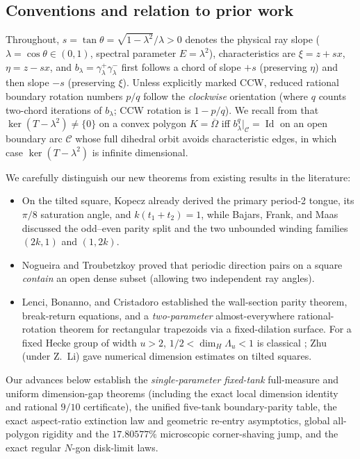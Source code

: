 \documentclass[11pt,reqno]{amsart}
\theoremstyle{definition}
\theoremstyle{remark}
\DeclareMathOperator{\Id}{Id}
\begin{document}
\subsection*{Conventions and relation to prior work}
Throughout, $s = \tan\theta = \sqrt{1-\lambda^2}/\lambda > 0$ denotes the physical ray slope ($\lambda = \cos\theta \in (0,1)$, spectral parameter $E = \lambda^2$), characteristics are $\xi = z + sx$, $\eta = z - sx$, and $b_\lambda = \gamma_\lambda^+\gamma_\lambda^-$ first follows a chord of slope $+s$ (preserving $\eta$) and then slope $-s$ (preserving $\xi$). Unless explicitly marked CCW, reduced rational boundary rotation numbers $p/q$ follow the \emph{clockwise} orientation (where $q$ counts two-chord iterations of $b_\lambda$; CCW rotation is $1 - p/q$). We recall from \cite[Thms.~2.1--2.2]{Paper1} that $\ker(T - \lambda^2) \ne \{0\}$ on a convex polygon $K = \overline{\Omega}$ iff $b_\lambda^q|_{\mathcal{C}} = \Id$ on an open boundary arc $\mathcal{C}$ whose full dihedral orbit avoids characteristic edges, in which case $\ker(T - \lambda^2)$ is infinite dimensional.

We carefully distinguish our new theorems from existing results in the literature:
\begin{itemize}
  \item On the tilted square, Kopecz \cite[Thms.~1--3 and p.~9]{Kopecz2006} already derived the primary period-2 tongue, its $\pi/8$ saturation angle, and $k(t_1+t_2) = 1$, while Bajars, Frank, and Maas \cite[\S 2.4]{BajarsFrankMaas2013} discussed the odd--even parity split and the two unbounded winding families $(2k,1)$ and $(1,2k)$.
  \item Nogueira and Troubetzkoy \cite[Thm.~13]{NogueiraTroubetzkoy2020} proved that periodic direction pairs on a square \emph{contain} an open dense subset (allowing two independent ray angles).
  \item Lenci, Bonanno, and Cristadoro \cite[Prop.~3.1, Thm.~3.2, Rem.~3.5, App.~A]{LBC2023} established the wall-section parity theorem, break-return equations, and a \emph{two-parameter} almost-everywhere rational-rotation theorem for rectangular trapezoids via a fixed-dilation surface. For a fixed Hecke group of width $u > 2$, $1/2 < \dim_H \Lambda_u < 1$ is classical \cite{Soares2021}; Zhu (under Z.~Li) \cite[\S 4.1]{ZhuLi2022} gave numerical dimension estimates on tilted squares.
\end{itemize}
Our advances below establish the \emph{single-parameter fixed-tank} full-measure and uniform dimension-gap theorems (including the exact local dimension identity and rational $9/10$ certificate), the unified five-tank boundary-parity table, the exact aspect-ratio extinction law and geometric re-entry asymptotics, global all-polygon rigidity and the $17.80577\%$ microscopic corner-shaving jump, and the exact regular $N$-gon disk-limit laws.
\end{document}

